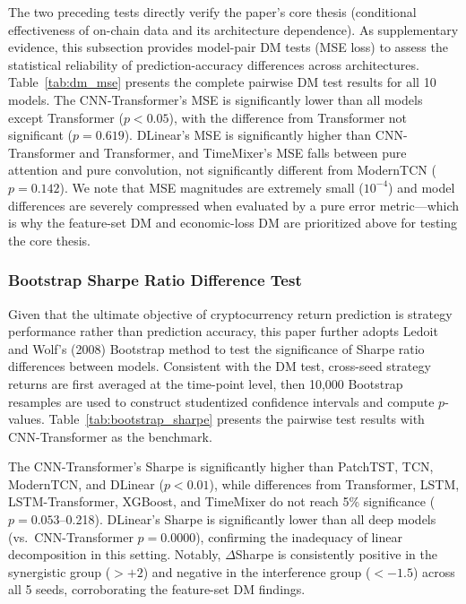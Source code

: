 \documentclass[a4paper]{cas-dc}
\begin{document}
The two preceding tests directly verify the paper's core thesis (conditional effectiveness of on-chain data and its architecture dependence). As supplementary evidence, this subsection provides model-pair DM tests \cite{diebold1995} (MSE loss) to assess the statistical reliability of prediction-accuracy differences across architectures. Table~\ref{tab:dm_mse} presents the complete pairwise DM test results for all 10 models. The CNN-Transformer's MSE is significantly lower than all models except Transformer ($p<0.05$), with the difference from Transformer not significant ($p=0.619$). DLinear's MSE is significantly higher than CNN-Transformer and Transformer, and TimeMixer's MSE falls between pure attention and pure convolution, not significantly different from ModernTCN ($p=0.142$). We note that MSE magnitudes are extremely small ($10^{-4}$) and model differences are severely compressed when evaluated by a pure error metric---which is why the feature-set DM and economic-loss DM are prioritized above for testing the core thesis.



\subsubsection{Bootstrap Sharpe Ratio Difference Test}

Given that the ultimate objective of cryptocurrency return prediction is strategy performance rather than prediction accuracy, this paper further adopts Ledoit and Wolf's (2008) Bootstrap method \cite{ledoit2008} to test the significance of Sharpe ratio differences between models. Consistent with the DM test, cross-seed strategy returns are first averaged at the time-point level, then 10,000 Bootstrap resamples are used to construct studentized confidence intervals and compute $p$-values. Table~\ref{tab:bootstrap_sharpe} presents the pairwise test results with CNN-Transformer as the benchmark.

The CNN-Transformer's Sharpe is significantly higher than PatchTST, TCN, ModernTCN, and DLinear ($p<0.01$), while differences from Transformer, LSTM, LSTM-Transformer, XGBoost, and TimeMixer do not reach 5\% significance ($p=0.053$--0.218). DLinear's Sharpe is significantly lower than all deep models (vs.\ CNN-Transformer $p=0.0000$), confirming the inadequacy of linear decomposition in this setting. Notably, $\Delta$Sharpe is consistently positive in the synergistic group ($>+2$) and negative in the interference group ($<-1.5$) across all 5 seeds, corroborating the feature-set DM findings.
\end{document}
